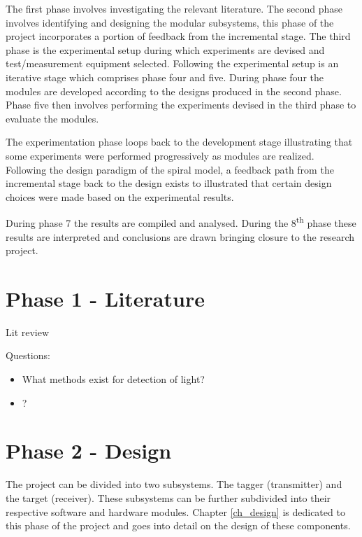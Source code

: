 The first phase involves investigating the relevant literature. The second phase involves identifying and designing the modular subsystems, this phase of the project incorporates a portion of feedback from the incremental stage. The third phase is the experimental setup during which experiments are devised and test/measurement equipment selected. Following the experimental setup is an iterative stage which comprises phase four and five. During phase four the modules are developed according to the designs produced in the second phase. Phase five then involves performing the experiments devised in the third phase to evaluate the modules.

The experimentation phase loops back to the development stage illustrating that some experiments were performed progressively as modules are realized. Following the design paradigm of the spiral model, a feedback path from the incremental stage back to the design exists to illustrated that certain design choices were made based on the experimental results.

During phase 7 the results are compiled and analysed. During the 8\textsuperscript{th} phase these results are interpreted and conclusions are drawn bringing closure to the research project.


\section{Phase 1 - Literature}

Lit review

Questions:

\begin{itemize}
	\item What methods exist for detection of light?
	\item ?
\end{itemize}



\section{Phase 2 - Design}

The project can be divided into two subsystems. The tagger (transmitter) and the target (receiver). These subsystems can be further subdivided into their respective software and hardware modules. Chapter \ref{ch_design} is dedicated to this phase of the project and goes into detail on the design of these components.

